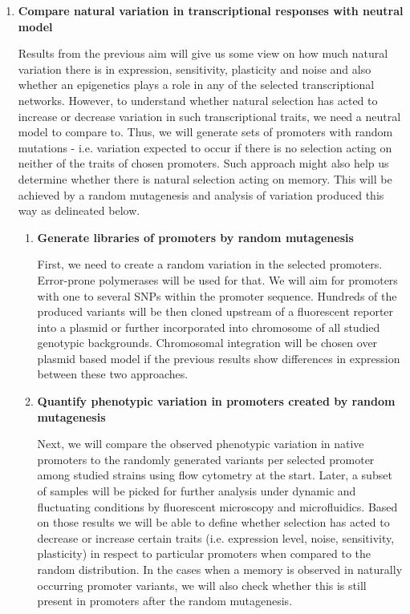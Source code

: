 \begin{enumerate}[font=\bfseries]
\begin{enumerate}[font=\bfseries]
	\end{enumerate}
	
	\item \textbf{Compare natural variation in transcriptional responses with neutral model}
	
	Results from the previous aim will give us some view on how much natural variation there is in expression, sensitivity, plasticity and noise and also whether an epigenetics plays a role in any of the selected transcriptional networks.
	However, to understand whether natural selection has acted to increase or decrease variation in such transcriptional traits, we need a neutral model to compare to.
	Thus, we will generate sets of promoters with random mutations - i.e. variation expected to occur if there is no selection acting on neither of the traits of chosen promoters.
	Such approach might also help us determine whether there is natural selection acting on memory.
	This will be achieved by a random mutagenesis and analysis of variation produced this way as delineated below.

	\begin{enumerate}[font=\bfseries]
	
		\item \textbf{Generate libraries of promoters by random mutagenesis}
		
		First, we need to create a random variation in the selected promoters.
		Error-prone polymerases will be used for that.
		We will aim for promoters with one to several SNPs within the promoter sequence.
		Hundreds of the produced variants will be then cloned upstream of a fluorescent reporter into a plasmid or further incorporated into chromosome of all studied genotypic backgrounds.
		Chromosomal integration will be chosen over plasmid based model if the previous results show differences in expression between these two approaches.

		\item \textbf{Quantify phenotypic variation in promoters created by random mutagenesis}
		
		Next, we will compare the observed phenotypic variation in native promoters to the randomly generated variants per selected promoter among studied strains using flow cytometry at the start.
		Later, a subset of samples will be picked for further analysis under dynamic and fluctuating conditions by fluorescent microscopy and microfluidics.
		Based on those results we will be able to define whether selection has acted to decrease or increase certain traits (i.e. expression level, noise, sensitivity, plasticity) in respect to particular promoters when compared to the random distribution.
		In the cases when a memory is observed in naturally occurring promoter variants, we will also check whether this is still present in promoters after the random mutagenesis.
	
	\end{enumerate}

\end{enumerate}

\cleardoublepage%

\shorthandon{-} 

